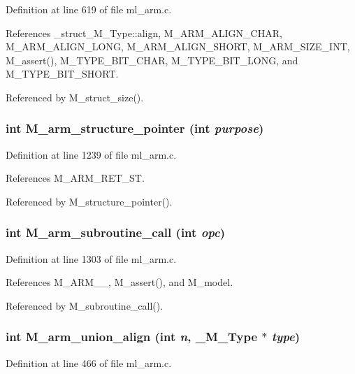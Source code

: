 Definition at line 619 of file ml\_\-arm.c.

References \_\-struct\_\-M\_\-Type::align, M\_\-ARM\_\-ALIGN\_\-CHAR, M\_\-ARM\_\-ALIGN\_\-LONG, M\_\-ARM\_\-ALIGN\_\-SHORT, M\_\-ARM\_\-SIZE\_\-INT, M\_\-assert(), M\_\-TYPE\_\-BIT\_\-CHAR, M\_\-TYPE\_\-BIT\_\-LONG, and M\_\-TYPE\_\-BIT\_\-SHORT.

Referenced by M\_\-struct\_\-size().
\subsubsection{\setlength{\rightskip}{0pt plus 5cm}int M\_\-arm\_\-structure\_\-pointer (int {\em purpose})}\label{ml__arm_8c_ac9b817a16a69fab6d0708dd058e7dbb}




Definition at line 1239 of file ml\_\-arm.c.

References M\_\-ARM\_\-RET\_\-ST.

Referenced by M\_\-structure\_\-pointer().
\subsubsection{\setlength{\rightskip}{0pt plus 5cm}int M\_\-arm\_\-subroutine\_\-call (int {\em opc})}\label{ml__arm_8c_92afdb8ce1293bd6e10f69c5aa219a75}




Definition at line 1303 of file ml\_\-arm.c.

References M\_\-ARM\_\_, M\_\-assert(), and M\_\-model.

Referenced by M\_\-subroutine\_\-call().
\subsubsection{\setlength{\rightskip}{0pt plus 5cm}int M\_\-arm\_\-union\_\-align (int {\em n}, \bf{\_\-M\_\-Type} $\ast$ {\em type})}\label{ml__arm_8c_00da9ddedee1773556a8a236e31c9620}




Definition at line 466 of file ml\_\-arm.c.

